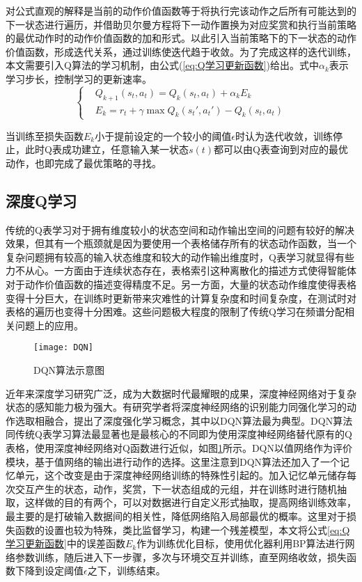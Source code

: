 对公式直观的解释是当前的动作价值函数等于将执行完该动作之后所有可能达到的下一状态进行遍历，并借助贝尔曼方程将下一动作置换为对应奖赏和执行当前策略的最优动作时的动作价值函数的加和形式。以此引入当前策略下的下一状态的动作价值函数，形成迭代关系，通过训练使迭代趋于收敛。为了完成这样的迭代训练，本文需要引入Q算法的学习机制，由公式(\ref{eq:Q学习更新函数})给出。式中$\alpha_{k}$表示学习步长，控制学习的更新速率。
\begin{equation}\label{eq:Q学习更新函数}
\left\lbrace 
\begin{aligned}
&Q_{k+1}\left ( s_{t},a_{t} \right )=Q_{k}\left ( s_{t},a_{t} \right )+\alpha_{k}E_{k}\\
&E_{k}=r_{t}+\gamma\max Q_{k}\left ( {s_{t}}' ,{a_{t}}'\right )-Q_{k}\left ( s_{t},a_{t}\right )
\end{aligned}
\right.
\end{equation}

当训练至损失函数$E_{k}$小于提前设定的一个较小的阈值$\epsilon$时认为迭代收敛，训练停止，此时Q表成功建立，任意输入某一状态$s(t)$都可以由Q表查询到对应的最优动作，也即完成了最优策略的寻找。
\subsection{深度Q学习}
传统的Q表学习对于拥有维度较小的状态空间和动作输出空间的问题有较好的解决效果，但其有一个瓶颈就是因为要使用一个表格储存所有的状态动作函数，当一个复杂问题拥有较高的输入状态维度和较大的动作输出维度时，Q表学习就显得有些力不从心。一方面由于连续状态存在，表格索引这种离散化的描述方式使得智能体对于动作价值函数的描述变得精度不足。另一方面，大量的状态动作维度使得表格变得十分巨大，在训练时更新带来灾难性的计算复杂度和时间复杂度，在测试时对表格的遍历也变得十分困难。这些问题极大程度的限制了传统Q学习在频谱分配相关问题上的应用。
\begin{figure}[h]
	\centering
	\texttt{[image: DQN]}
	\caption{DQN算法示意图}
	\label{fig:DQN}
\end{figure}

近年来深度学习研究广泛，成为大数据时代最耀眼的成果，深度神经网络对于复杂状态的感知能力极为强大。有研究学者将深度神经网络的识别能力同强化学习的动作选取相融合，提出了深度强化学习\cite{mnih2013playing}概念，其中以DQN算法最为典型。DQN算法同传统Q表学习算法最显著也是最核心的不同即为使用深度神经网络替代原有的Q表格，使用深度神经网络对Q函数进行近似，如图\ref{fig:DQN}所示。DQN以值网络作为评价模块，基于值网络的输出进行动作的选择。这里注意到DQN算法还加入了一个记忆单元，这个改变是由于深度神经网络训练的特殊性引起的。加入记忆单元储存每次交互产生的状态，动作，奖赏，下一状态组成的元组，并在训练时进行随机抽取，这样做的目的有两个，可以对数据进行自定义形式抽取，提高网络训练效率，最主要的是打破输入数据间的相关性，降低网络陷入局部最优的概率。这里对于损失函数的设置也较为特殊，类比监督学习，构建一个残差模型，本文将公式\ref{eq:Q学习更新函数}中的误差函数$E_{k}$作为训练优化目标，使用优化器利用BP算法进行网络参数训练，随后进入下一步骤，多次与环境交互并训练，直至网络收敛，损失函数下降到设定阈值$\epsilon$之下，训练结束。

